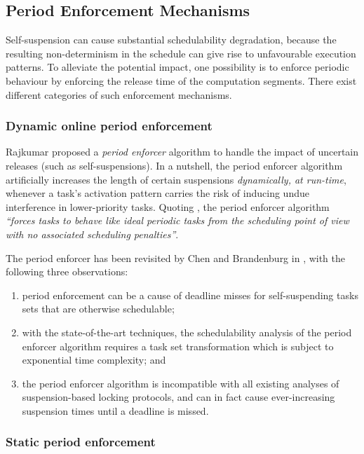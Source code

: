   
\subsection{Period Enforcement Mechanisms}   
\label{sec:release-enforce}

Self-suspension can cause substantial schedulability degradation, because the resulting non-determinism in the schedule can give rise 
to unfavourable execution patterns. To alleviate the potential impact, one possibility is to enforce periodic behaviour by 
enforcing the release time of the computation segments. There exist different categories of such enforcement mechanisms. 


\subsubsection{Dynamic online period enforcement} 
\label{sec:period-enforce}

Rajkumar \cite{Raj:suspension1991} proposed a \emph{period enforcer} 
algorithm to handle the impact of uncertain releases (such as self-suspensions). In a nutshell, the period enforcer algorithm artificially 
increases the length of certain suspensions \emph{dynamically, at run-time},
whenever a task's activation pattern carries the risk of inducing undue interference in 
lower-priority tasks. Quoting \cite{Raj:suspension1991}, the period enforcer algorithm \textit{``forces tasks to behave like ideal 
periodic tasks from the scheduling point of view with no associated scheduling penalties''}. 

The period enforcer has been revisited by Chen and Brandenburg in \cite{ChenBrandenburg}, with the following three observations:
\begin{enumerate}
	\item period enforcement can be a cause of deadline misses for self-suspending tasks sets that are otherwise schedulable;
	\item with the state-of-the-art techniques, the schedulability analysis of the period enforcer algorithm requires a task set 
	transformation which is subject to exponential time complexity; and 	
    \item the period enforcer algorithm is incompatible with all existing analyses of suspension-based locking protocols, 
	and can in fact cause ever-increasing suspension times until a deadline is missed.
\end{enumerate}

\subsubsection{Static period enforcement} 
\label{sec:static-period-enforce}

